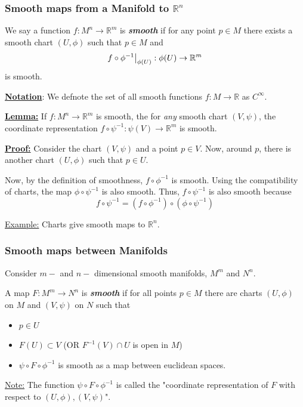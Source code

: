 \documentclass{article}
\newcommand{\R}{\mathbb{R}}
\newcommand{\restr}[2]{{%
  \left.\kern-\nulldelimiterspace %
  #1 %
  \vphantom{\big|} %
  \right|_{#2} %
  }}
\begin{document}
\vskip 0.5cm
\subsubsection{Smooth maps from a Manifold to $\R^n$}

\begin{mathdefinitionbox}{}
We say a function $f : M^n \rightarrow \R^m$ is \textbf{\emph{smooth}} if for any point $p \in M$ there exists a smooth chart $(U, \phi)$ such that $p \in M$ and 
\[ \restr{f \circ \phi^{-1}}{\phi(U)} : \phi(U) \rightarrow \R^m \]
is smooth.

\vskip 0.5cm
\underline{\textbf{Notation}}: We defnote the set of all smooth functions $f : M \rightarrow \R$ as $C^{\infty}$.
\end{mathdefinitionbox}


\vskip 0.5cm
\begin{dottedbox}
  \underline{\textbf{Lemma:}} If $f : M^n \rightarrow \R^m$ is smooth, the for \emph{any} smooth chart $(V, \psi)$, the coordinate representation $f \circ \psi^{-1} : \psi(V) \rightarrow \R^m$ is smooth.
\end{dottedbox}


\vskip 0.5cm
\underline{\textbf{Proof:}} Consider the chart $(V, \psi)$ and a point $p \in V$. Now, around $p$, there is another chart $(U, \phi)$ such that $p \in U$.

Now, by the definition of smoothness, $f \circ \phi^{-1}$ is smooth. Using the compatibility of charts, the map $\phi \circ \psi^{-1}$ is also smooth. Thus, $f \circ \psi^{-1}$ is also smooth because 
\[ f \circ \psi^{-1} = (f \circ \phi^{-1}) \circ (\phi \circ \psi^{-1}) \] 

\vskip 0.5cm
\underline{Example:} Charts give smooth maps to $\R^n$.

\vskip 1cm
\subsubsection{Smooth maps between Manifolds}

Consider $m-$ and $n-$ dimensional smooth manifolds, $M^m$ and $N^n$. 

\begin{mathdefinitionbox}{}
  A map $F : M^m \rightarrow N^n$ is \textbf{\emph{smooth}} if for all points $p \in M$ there are charts $(U, \phi)$ on $M$ and $(V, \psi)$ on $N$ such that 
  \begin{itemize}
    \item $p \in U$
    \item $F(U) \subset V$ (OR $F^{-1}(V) \cap U$ is open in $M$)
    \item $\psi \circ F \circ \phi^{-1}$ is smooth as a map between euclidean spaces. 
  \end{itemize}
  \underline{Note:} The function $\psi \circ F \circ \phi^{-1}$ is called the "coordinate representation of $F$ with respect to $(U, \phi), (V, \psi)$".
\end{mathdefinitionbox}
\end{document}
